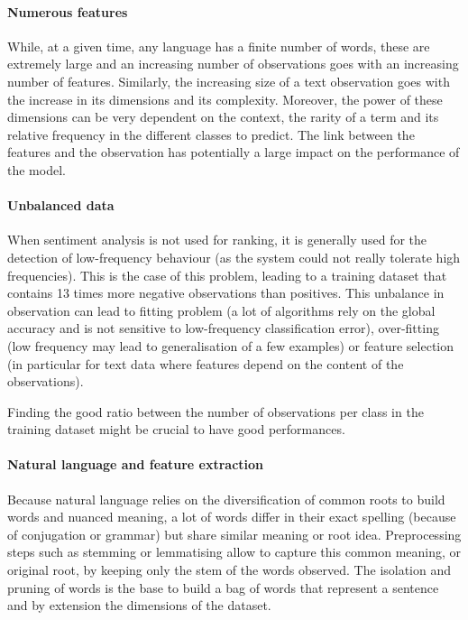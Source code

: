 \documentclass[a4paper]{tufte-handout}
\begin{document}
\begin{fullwidth}
\paragraph{Numerous features}

While, at a given time, any language has a finite number of words, these are extremely large and an increasing number of observations goes with an increasing number of features. Similarly, the increasing size of a text observation goes with the increase in its dimensions and its complexity. Moreover, the power of these dimensions can be very dependent on the context, the rarity of a term and its relative frequency in the different classes to predict. The link between the features and the observation has potentially a large impact on the performance of the model.


\paragraph{Unbalanced data}

When sentiment analysis is not used for ranking, it is generally used for the detection of low-frequency behaviour (as the system could not really tolerate high frequencies). This is the case of this problem, leading to a training dataset that contains 13 times more negative observations than positives. This unbalance in observation can lead to fitting problem (a lot of algorithms rely on the global accuracy and is not sensitive to low-frequency classification error), over-fitting (low frequency may lead to generalisation of a few examples) or feature selection (in particular for text data where features depend on the content of the observations).

Finding the good ratio between the number of observations per class in the training dataset might be crucial to have good performances.

\paragraph{Natural language and feature extraction}

Because natural language relies on the diversification of common roots to build words and nuanced meaning, a lot of words differ in their exact spelling (because of conjugation or grammar) but share similar meaning or root idea. Preprocessing steps such as stemming or lemmatising allow to capture this common meaning, or original root, by keeping only the stem of the words observed. The isolation and pruning of words is the base to build a bag of words that represent a sentence and by extension the dimensions of the dataset.


\end{fullwidth}
\end{document}
